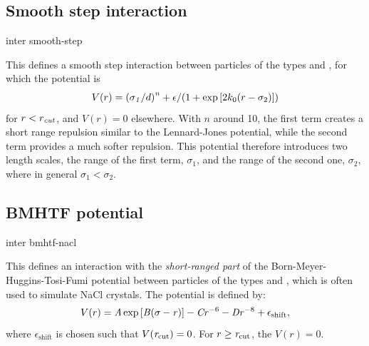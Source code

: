 \subsection{Smooth step interaction}
\begin{essyntax}
  inter  
  smooth-step   \var{\epsilon} 
   
  \begin{features}
  \end{features}
\end{essyntax}
This defines a smooth step interaction between particles of the
types  and , for which the potential is
\begin{equation}
  V(r)= \left(\mathrm{\mathit{\sigma_1}}/d\right)^{\mathrm{\mathit{n}}} + \epsilon/(1 + \exp\left[2k_0 (r - \sigma_2)\right])
\end{equation}
for $r<r_\mathrm{\mathrm{\mathit{cut}}}$, and $V(r)=0$ elsewhere. With $n$ around
10, the first term creates a short range repulsion similar to the
Lennard-Jones potential, while the second term provides a much softer
repulsion. This potential therefore introduces two length scales, the
range of the first term, $\sigma_1$, and the range of the second one,
$\sigma_2$, where in general $\sigma_1<\sigma_2$.

\subsection{BMHTF potential}
\begin{essyntax}
  inter  
  bmhtf-nacl     \var{\sigma} 
  \begin{features}
  \end{features}
\end{essyntax}
This defines an interaction with the {\em short-ranged part} of the
Born-Meyer-Huggins-Tosi-Fumi potential between particles of the types
 and , which is often used to simulate NaCl
crystals. The potential is defined by:
\begin{equation}
  V(r)= \mathrm{\mathit{A}}\exp\left[\mathrm{\mathit{B}}(\mathrm{\mathit{\sigma}} - \mathrm{\mathit{r}})\right] -
  \mathrm{\mathit{C}} \mathrm{\mathit{r}}^{-6} - \mathrm{\mathit{D}} \mathrm{\mathit{r}}^{-8} + \epsilon_\mathrm{shift},
\end{equation}
where $\epsilon_\mathrm{shift}$ is chosen such that
$V(\mathrm{\mathit{r_\mathrm{cut}}})=0$. For $r\ge \mathrm{\mathit{r_\mathrm{cut}}}$, the
$V(r)=0$.

